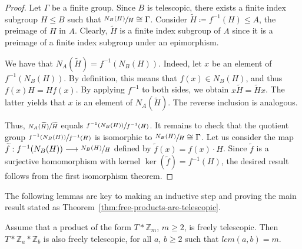 \documentclass[ALCO,ThmDefs,Unicode,epreuves]{cedram}
\newcommand{\ZZ}{\mathbb{Z}}
\begin{document}
\begin{proof}
Let $\Gamma$ be a finite group. Since $B$ is telescopic, there exists a finite index subgroup $H \leq B$ such that $\sfrac{N_B (H)}{H} \cong \Gamma$. Consider $ \widetilde{H}\coloneqq f^{-1}(H) \leq A$, the preimage of $H$ in $A$. Clearly, $\widetilde{H}$ is a finite index subgroup of $A$ since it is a preimage of a finite index subgroup under an epimorphism.

We have that $ N_A(\widetilde{H})=f^{-1}(N_B(H))$. Indeed, let $x$ be an element of $f^{-1}(N_B(H))$. By definition, this means that $f(x) \in N_B (H)$, and thus $f(x) H = H f(x)$. By applying $f^{-1}$ to both sides, we obtain $x \widetilde{H} = \widetilde{H} x$. The latter yields that $x$ is an element of $N_A(\widetilde{H})$. The reverse inclusion is analogous. 

Thus, $\sfrac{N_A (\widetilde{H})}{\widetilde{H}}$ equals $ \sfrac{f^{-1}(N_B(H))}{f^{-1}(H)}$. It remains to check that the quotient group $ \sfrac{f^{-1}(N_B(H))}{f^{-1}(H)}$ is isomorphic to $\sfrac{N_B(H)}{H} \cong \Gamma$. Let us consider the map $\widetilde{f} : f^{-1}(N_{B}(H)) \longrightarrow \sfrac{N_B(H)}{H}$ defined by $\widetilde{f}(x) = f(x) \cdot H$. Since $\widetilde{f}$ is a surjective homomorphism with kernel $\ker(\widetilde{f})=f^{-1}(H)$, the desired result follows from the first isomorphism theorem.
\end{proof}

The following lemmas are key to making an inductive step and proving the main result stated as Theorem~\ref{thm:free-products-are-telescopic}.

\begin{lemm}\label{lemma:telescopic-lcm}
Assume that a product of the form $T*\ZZ_{m}$, $m \geq 2$, is freely telescopic. Then $T*\ZZ_a*\ZZ_b$ is also freely telescopic, for all $a$, $b\geq 2$ such that $lcm(a, b) = m$.
\end{lemm}
\end{document}
